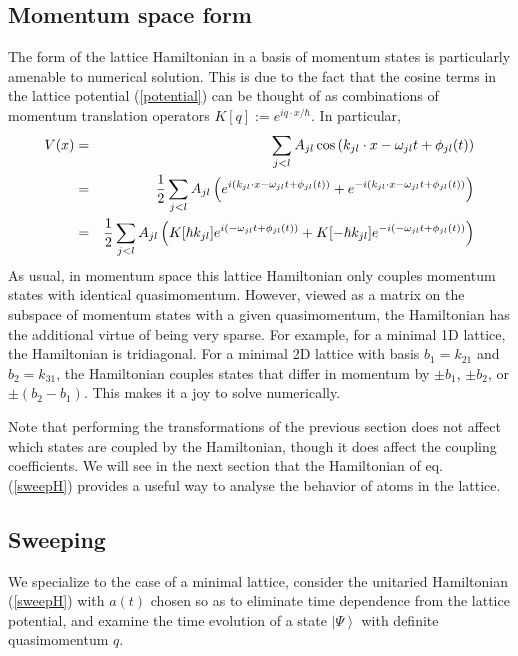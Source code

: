 \documentclass[aps,prb,floatfix,amsmath,amssymb,groupedaddress]{revtex4}
\begin{document}
\subsection{Momentum space form}
The form of the lattice Hamiltonian in a basis of momentum states is particularly amenable to numerical solution.  This is due to the fact that the cosine terms in the lattice potential (\ref{potential}) can be thought of as combinations of momentum translation operators $K[q]:=e^{iq\cdot x/\hbar}$.  In particular, 
\begin{eqnarray*}
V(x) & = & \sum_{j<l} A_{jl} \cos\left( k_{jl} \cdot x - \omega_{jl} t + \phi_{jl}(t)\right) \\
& = & {\frac{1}{2}} \sum_{j<l} A_{jl} \left(e^{i\left( k_{jl} \cdot x - \omega_{jl} t + \phi_{jl}(t)\right)} + e^{-i\left( k_{jl} \cdot x - \omega_{jl} t + \phi_{jl}(t)\right)}\right) \\
& = & {\frac{1}{2}} \sum_{j<l} A_{jl} \left(K[\hbar k_{jl}]e^{i\left(- \omega_{jl} t + \phi_{jl}(t)\right)} + K[-\hbar k_{jl}]e^{-i\left(- \omega_{jl} t + \phi_{jl}(t)\right)}\right) \\
\end{eqnarray*}
As usual, in momentum space this lattice Hamiltonian only couples momentum states with identical quasimomentum.  However, viewed as a matrix on the subspace of momentum states with a given quasimomentum, the Hamiltonian has the additional virtue of being very sparse.  For example, for a minimal 1D lattice, the Hamiltonian is tridiagonal.  For a minimal 2D lattice with basis $b_1 = k_{21}$ and $b_2 = k_{31}$, the Hamiltonian couples states that differ in momentum by $\pm b_1$, $\pm b_2$, or $\pm(b_2-b_1)$.  This makes it a joy to solve numerically.  

Note that performing the transformations of the previous section does not affect which states are coupled by the Hamiltonian, though it does affect the coupling coefficients.  We will see in the next section that the Hamiltonian of eq. (\ref{sweepH}) provides a useful way to analyse the behavior of atoms in the lattice.

\subsection{Sweeping}
We specialize to the case of a minimal lattice, consider the unitaried Hamiltonian (\ref{sweepH}) with $a(t)$ chosen so as to eliminate time dependence from the lattice potential, and examine the time evolution of a state $\left|\Psi\right>$ with definite quasimomentum $q$.  
\end{document}
